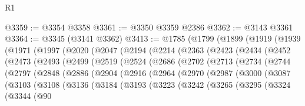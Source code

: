 \begin{lexlean}{R1}
\begin{coremodule}
@3359 := @3354 @3358
@3361 := @3350 @3359 @2386
@3362 := @3143 @3361
@3364 := @3345 (@3141 @3362)
@3413 := @1785
    (@1799
      (@1899
        (@1919
          (@1939
            (@1971
              (@1997
                (@2020
                  (@2047
                    (@2194
                      (@2214
                        (@2363
                          (@2423
                            (@2434
                              (@2452
                                (@2473
                                  (@2493
                                    (@2499
                                      (@2519
                                        (@2524
                                          (@2686
                                            (@2702
                                              (@2713
                                                (@2734
                                                  (@2744
                                                    (@2797
                                                      (@2848
                                                        (@2886
                                                          (@2904
                                                            (@2916
                                                              (@2964
                                                                (@2970
                                                                  (@2987
                                                                    (@3000
                                                                      (@3087
                                                                        (@3103
                                                                          (@3108
                                                                            (@3136
                                                                              (@3184
                                                                                (@3193
                                                                                  (@3223
                                                                                    (@3242
                                                                                      (@3265
                                                                                        (@3295
                                                                                          (@3324
                                                                                            (@3344
                                                                                              (@90

\end{coremodule}
\end{lexlean}
